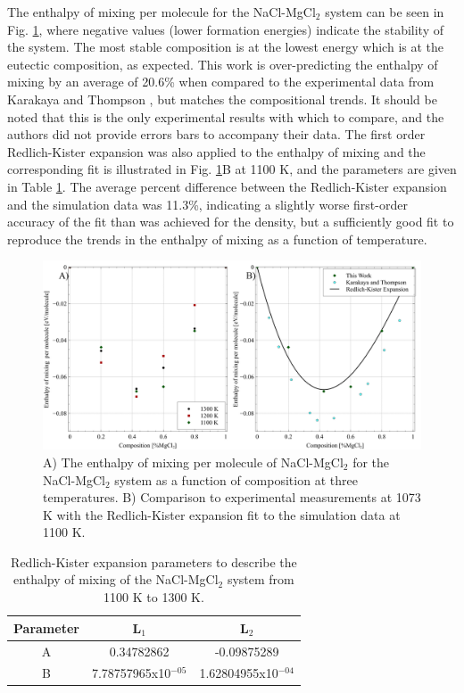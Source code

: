\documentclass[review]{elsarticle}
\begin{document}
The enthalpy of mixing per molecule for the NaCl-MgCl$_2$ system can be seen in Fig. \ref{fig:enthalpy}, where negative values (lower formation energies) indicate the stability of the system. The most stable composition is at the lowest energy which is at the eutectic composition, as expected. This work is over-predicting the enthalpy of mixing by an average of 20.6\% when compared to the experimental data from Karakaya and Thompson \cite{karakaya1986thermodynamic}, but matches the compositional trends. It should be noted that this is the only experimental results with which to compare, and the authors did not provide errors bars to accompany their data. The first order Redlich-Kister expansion was also applied to the enthalpy of mixing and the corresponding fit is illustrated in Fig. \ref{fig:enthalpy}B at 1100 K, and the parameters are given in Table \ref{table:RK_en}. The average percent difference between the Redlich-Kister expansion and the simulation data was 11.3\%, indicating a slightly worse first-order accuracy of the fit than was achieved for the density, but a sufficiently good fit to reproduce the trends in the enthalpy of mixing as a function of temperature.

\begin{figure}[h]
 \centering
 \includegraphics[width=1.0\textwidth]{enthalpy.jpg} 
 \caption{A) The enthalpy of mixing per molecule of NaCl-MgCl$_{2}$ for the NaCl-MgCl$_{2}$ system as a function of composition at three temperatures. B) Comparison to experimental measurements at 1073 K \cite{karakaya1986thermodynamic} with the Redlich-Kister expansion fit to the simulation data at 1100 K.}
 \label{fig:enthalpy}
\end{figure} 

\begin{table}[]
\centering
\caption{Redlich-Kister expansion parameters to describe the enthalpy of mixing of the NaCl-MgCl$_2$ system from 1100 K to 1300 K.}
\begin{tabular}{|c|c|c|}
\hline
Parameter & L$_1$ & L$_2$ \\
\hline

A	& 0.34782862    & -0.09875289\\
B	  & 7.78757965x10$^{-05}$   & 1.62804955x10$^{-04}$\\
\hline
\end{tabular}
\label{table:RK_en}
\end{table}
\end{document}
